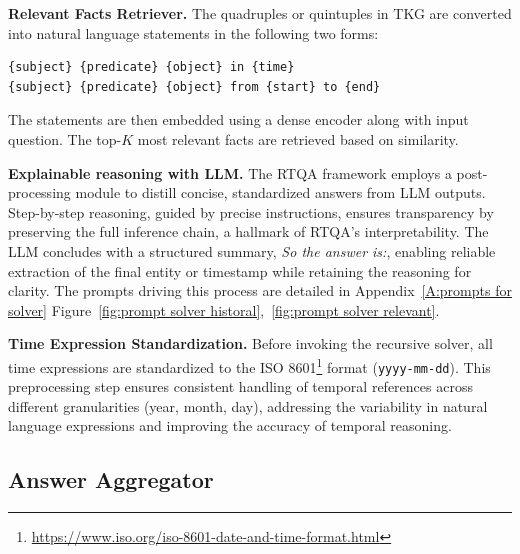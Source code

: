 \documentclass[11pt]{article}
\begin{document}
\textbf{Relevant Facts Retriever.} 
The quadruples or quintuples in TKG are converted into natural language statements in the following two forms:
\begin{center}
\begin{tcolorbox}[colback=gray!10, boxrule=0pt, arc=1pt, width=0.48\textwidth, height=1cm, halign=left, valign=center]
\begin{Verbatim}[fontsize=\scriptsize]
{subject} {predicate} {object} in {time}
{subject} {predicate} {object} from {start} to {end}
\end{Verbatim}
\end{tcolorbox}
\end{center}
The statements are then embedded using a dense encoder along
with input question. The top-$K$ most relevant facts are retrieved based on similarity.

\textbf{Explainable reasoning with LLM.}
The RTQA framework employs a post-processing module to distill concise, standardized answers from LLM outputs. Step-by-step reasoning, guided by precise instructions, ensures transparency by preserving the full inference chain, a hallmark of RTQA’s interpretability. The LLM concludes with a structured summary, \textit{So the answer is:}, enabling reliable extraction of the final entity or timestamp while retaining the reasoning for clarity. The prompts driving this process are detailed in Appendix~\ref{A:prompts for solver} Figure~\ref{fig:prompt solver historal},~\ref{fig:prompt solver relevant}.


\textbf{Time Expression Standardization.}
Before invoking the recursive solver, all time expressions are standardized to the ISO 8601\footnote{\footnotesize \url{https://www.iso.org/iso-8601-date-and-time-format.html}} format (\texttt{yyyy-mm-dd}). This preprocessing step ensures consistent handling of temporal references across different granularities (year, month, day), addressing the variability in natural language expressions and improving the accuracy of temporal reasoning.


\subsection{Answer Aggregator}\label{section:answer}
\end{document}
